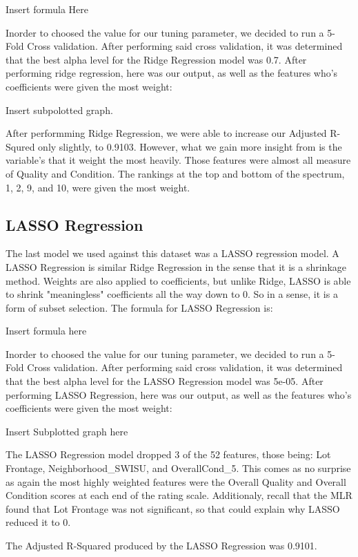 \documentclass{article}
\begin{document}
\begin{enumerate}
	Insert formula Here

	Inorder to choosed the value for our tuning parameter, we decided to run a 5-Fold Cross validation. After performing said cross validation, it was determined that the best alpha level for the Ridge Regression model was 0.7. After performing ridge regression, here was our output, as well as the features who's coefficients were given the most weight:

	Insert subpolotted graph.

	After performming Ridge Regression, we were able to increase our Adjusted R-Squred only slightly, to 0.9103. However, what we gain more insight from is the variable's that it weight the most heavily. Those features were almost all measure of Quality and Condition. The rankings at the top and bottom of the spectrum, 1, 2, 9, and 10, were given the most weight. 

	\subsection{LASSO Regression}

	The last model we used against this dataset was a LASSO regression model. A LASSO Regression is similar Ridge Regression in the sense that it is a shrinkage method. Weights are also applied to coefficients, but unlike Ridge, LASSO is able to shrink "meaningless" coefficients all the way down to 0. So in a sense, it is a form of subset selection. The formula for LASSO Regression is:

	Insert formula here

	Inorder to choosed the value for our tuning parameter, we decided to run a 5-Fold Cross validation. After performing said cross validation, it was determined that the best alpha level for the LASSO Regression model was 5e-05. After performing LASSO Regression, here was our output, as well as the features who's coefficients were given the most weight:

	Insert Subplotted graph here

	The LASSO Regression model dropped 3 of the 52 features, those being: Lot Frontage, Neighborhood_SWISU, and OverallCond_5. This comes as no surprise as again the most highly weighted features were the Overall Quality and Overall Condition scores at each end of the rating scale. Additionaly, recall that the MLR found that Lot Frontage was not significant, so that could explain why LASSO reduced it to 0.

	The Adjusted R-Squared produced by the LASSO Regression was 0.9101.
	

\end{enumerate}
\end{document}
